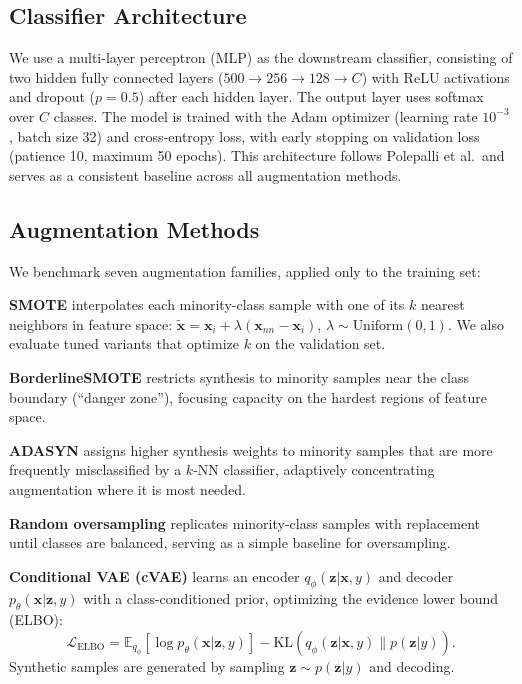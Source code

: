 \documentclass{article}
\begin{document}
\subsection{Classifier Architecture}

We use a multi-layer perceptron (MLP) as the downstream classifier, consisting of two hidden
fully connected layers ($500{\to}256{\to}128{\to}C$) with ReLU activations and dropout
($p{=}0.5$) after each hidden layer. The output layer uses softmax over $C$ classes. The model
is trained with the Adam optimizer (learning rate $10^{-3}$, batch size 32) and cross-entropy
loss, with early stopping on validation loss (patience 10, maximum 50 epochs). This architecture
follows Polepalli et al.\ and serves as a consistent baseline across all augmentation methods.

\subsection{Augmentation Methods}

We benchmark seven augmentation families, applied only to the training set:

\textbf{SMOTE} interpolates each minority-class sample with one of its $k$ nearest neighbors in
feature space: $\tilde{\mathbf{x}} = \mathbf{x}_i + \lambda(\mathbf{x}_{nn} - \mathbf{x}_i)$,
$\lambda \sim \text{Uniform}(0,1)$. We also evaluate tuned variants that optimize $k$ on the
validation set.

\textbf{BorderlineSMOTE} restricts synthesis to minority samples near the class boundary
(``danger zone''), focusing capacity on the hardest regions of feature space.

\textbf{ADASYN} assigns higher synthesis weights to minority samples that are more frequently
misclassified by a $k$-NN classifier, adaptively concentrating augmentation where it is most needed.

\textbf{Random oversampling} replicates minority-class samples with replacement until classes are
balanced, serving as a simple baseline for oversampling.

\textbf{Conditional VAE (cVAE)} learns an encoder $q_\phi(\mathbf{z}|\mathbf{x},y)$ and
decoder $p_\theta(\mathbf{x}|\mathbf{z},y)$ with a class-conditioned prior, optimizing the
evidence lower bound (ELBO):
\begin{equation}
  \mathcal{L}_\text{ELBO} = \mathbb{E}_{q_\phi}[\log p_\theta(\mathbf{x}|\mathbf{z},y)]
    - \text{KL}(q_\phi(\mathbf{z}|\mathbf{x},y) \| p(\mathbf{z}|y)).
\end{equation}
Synthetic samples are generated by sampling $\mathbf{z} \sim p(\mathbf{z}|y)$ and decoding.
\end{document}
